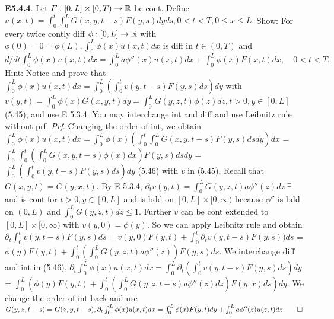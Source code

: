 {\bf E5.4.4}. Let $F: [0,L]\times [0,T) \rightarrow \mathbb{R}$ be cont. Define $u(x,t)= \int_0^t \int_0^L G(x,y,t-s)F(y,s)dy ds,  0 < t < T,  0 \leq x \leq L.$ Show:  For every twice contly diff $\phi: [0,L] \rightarrow \mathbb{R}$ with $\phi(0) = 0 = \phi(L), \int_0^L \phi(x)u(x,t)dx$ is diff in $t \in (0,T)$ and $d/dt \int_0^L  \phi(x) u(x,t) dx = \int_0^L  a\phi''(x)u(x,t)dx + \int_0^L  \phi(x)F(x,t)dx, \quad 0 < t < T.$ Hint:  Notice and prove that $ \int_0^L  \phi(x)u(x,t)dx = \int_0^L ( \int_0^t v(y,t-s) F(y,s)ds) dy$ with $v(y,t) =  \int_0^L  \phi(x)G(x,y,t)dy = \int_0^L  G(y,z,t)\phi(z)dz,  t>0, y \in [0,L]$ (5.45), and use E 5.3.4.  You may interchange int and diff and use Leibnitz rule without prf. 
{\it Prf}. Changing the order of int, we obtain $\int_0^L \phi(x) u(x,t) dx = \int_0^L \phi(x)( \int_0^t \int_0^L G(x,y,t-s) F(y,s)ds dy )dx$ =  $\int_0^L \int_0^t (\int_0^L G(x,y,t-s)\phi(x) dx) F(y,s)ds dy$ =  $\int_0^L (\int_0^t v(y,t-s) F(y,s)ds) dy$ (5.46) with $v$ in (5.45). Recall that $G(x,y,t) = G(y,x,t)$. By E 5.3.4, $\partial_t v(y,t) = \int_0^L G(y,z,t) a \phi''(z) dz \; \exists$ and is cont for $t > 0, y \in [0,L]$ and is bdd on $[0,L] \times [0, \infty)$ because $\phi''$ is bdd on $(0, L)$ and $\int_0^L G(y,z,t) dz \leq 1$. Further $v$ can be cont extended to $[0, L] \times [0, \infty)$ with $v(y,0) = \phi(y)$. So we can apply Leibnitz rule and obtain $\partial_t \int_0^t v(y,t-s) F(y,s)ds  =  v(y,0) F(y,t) + \int_0^t \partial_t v(y,t-s) F(y,s))ds$ = $\phi(y) F(y,t) + \int_0^t ( \int_0^L G(y,z,t) a \phi''(z))F(y,s)ds$.  We interchange diff and int in (5.46), $\partial_t \int_0^L \phi(x) u(x,t)dx = \int_0^L \partial_t ( \int_0^t v(y,t-s)F(y,s)ds)dy$ = $\int_0^L (\phi(y) F(y,t) + \int_0^t ( \int_0^L G(y,z,t-s) a \phi''(z)dz ) F(y,x) ds) dy$.  We change the order of int back and use $G(y,z,t-s) = G(z,y,t-s), \partial_t \int_0^L \phi(x) u(x,t)dx = \int_0^L \phi(x) F(y,t)dy + \int_0^L a \phi''(z)u(z,t)dz \qed$
